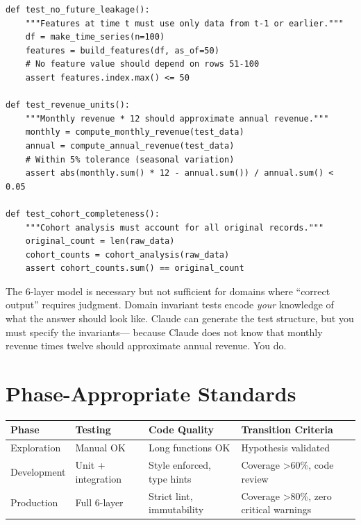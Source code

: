 \begin{verbatim}
def test_no_future_leakage():
    """Features at time t must use only data from t-1 or earlier."""
    df = make_time_series(n=100)
    features = build_features(df, as_of=50)
    # No feature value should depend on rows 51-100
    assert features.index.max() <= 50

def test_revenue_units():
    """Monthly revenue * 12 should approximate annual revenue."""
    monthly = compute_monthly_revenue(test_data)
    annual = compute_annual_revenue(test_data)
    # Within 5% tolerance (seasonal variation)
    assert abs(monthly.sum() * 12 - annual.sum()) / annual.sum() < 0.05

def test_cohort_completeness():
    """Cohort analysis must account for all original records."""
    original_count = len(raw_data)
    cohort_counts = cohort_analysis(raw_data)
    assert cohort_counts.sum() == original_count
\end{verbatim}


\begin{keyinsight}
The 6-layer model is necessary but not sufficient for domains where
``correct output'' requires judgment. Domain invariant tests encode
\emph{your} knowledge of what the answer should look like. Claude
can generate the test structure, but you must specify the invariants---
because Claude does not know that monthly revenue times twelve should
approximate annual revenue. You do.
\end{keyinsight}

\section{Phase-Appropriate Standards}
\label{sec:phases}


\begin{fullwidth}
\begin{tabular}{@{}lp{3cm}p{3cm}p{4cm}@{}}
\toprule
\textbf{Phase} & \textbf{Testing} & \textbf{Code Quality} & \textbf{Transition Criteria} \\
\midrule
Exploration & Manual OK & Long functions OK & Hypothesis validated \\
Development & Unit + integration & Style enforced, type hints & Coverage >60\%, code review \\
Production & Full 6-layer & Strict lint, immutability & Coverage >80\%, zero critical warnings \\
\bottomrule
\end{tabular}
\end{fullwidth}

